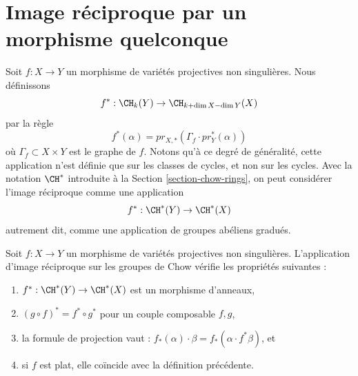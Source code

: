 \section{Image réciproque par un morphisme quelconque}
\label{section-general-pullback}

\noindent
Soit $f : X \to Y$ un morphisme de variétés projectives non singulières.
Nous définissons
$$
f^* : \CH_k(Y) \to \CH_{k+\dim X - \dim Y}(X)
$$
par la règle
$$
f^*(\alpha) = pr_{X, *}(\Gamma_f \cdot pr_Y^*(\alpha))
$$
où $\Gamma_f \subset X\times Y$ est le graphe de $f$. Notons qu'à ce
degré de généralité, cette application n'est définie que sur les classes de cycles, et non sur les cycles. Avec la
notation $\CH^*$ introduite à la Section \ref{section-chow-rings},
on peut considérer l'image réciproque comme une application
$$
f^* : \CH^*(Y) \to \CH^*(X)
$$
autrement dit, comme une application de groupes abéliens gradués.

\begin{lemma}
\label{lemma-pullback-and-intersection-product}
Soit $f : X \to Y$ un morphisme de variétés projectives non singulières.
L'application d'image réciproque sur les groupes de Chow vérifie les propriétés suivantes :
\begin{enumerate}
\item $f^* : \CH^*(Y) \to \CH^*(X)$ est un morphisme d'anneaux,
\item $(g \circ f)^* = f^* \circ g^*$ pour un couple composable $f, g$,
\item la formule de projection vaut : $f_*(\alpha) \cdot \beta =
f_*( \alpha \cdot f^*\beta)$, et
\item si $f$ est plat, elle coïncide avec la définition précédente.
\end{enumerate}
\end{lemma}

